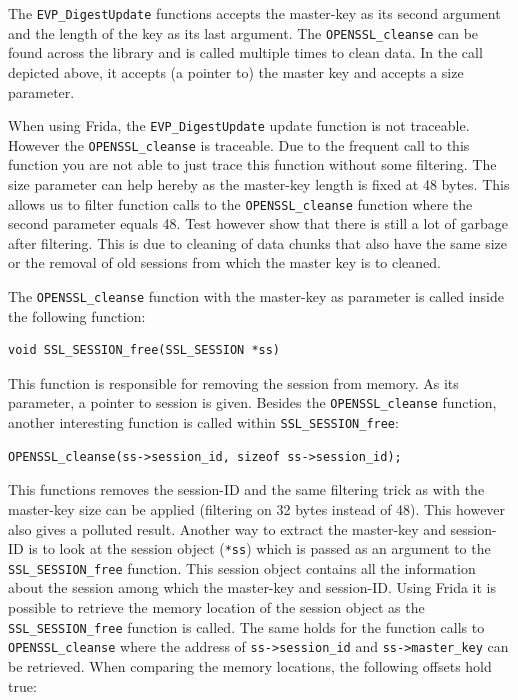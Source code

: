 \documentclass[12pt, a4paper]{report}
\begin{document}
The \texttt{EVP\_DigestUpdate} functions accepts the master-key as its second argument and the length of the key as its last argument. The \texttt{OPENSSL\_cleanse} can be found across the library and is called multiple times to clean data. In the call depicted above, it accepts (a pointer to) the master key and accepts a size parameter. 

When using Frida, the \texttt{EVP\_DigestUpdate} update function is not traceable. However the \texttt{OPENSSL\_cleanse} is traceable. Due to the frequent call to this function you are not able to just trace this function without some filtering. The size parameter can help hereby as the master-key length is fixed at 48 bytes. This allows us to filter function calls to the \texttt{OPENSSL\_cleanse} function where the second parameter equals 48. Test however show that there is still a lot of garbage after filtering. This is due to cleaning of data chunks that also have the same size or the removal of old sessions from which the master key is to cleaned. 


\noindent The \texttt{OPENSSL\_cleanse} function with the master-key as parameter is called inside the following function:

\begin{lstlisting}[frame=single, breaklines=true]
void SSL_SESSION_free(SSL_SESSION *ss)
\end{lstlisting}

This function is responsible for removing the session from memory. As its parameter, a pointer to session is given. Besides the \texttt{OPENSSL\_cleanse} function, another interesting function is called within \texttt{SSL\_SESSION\_free}:
\\
\begin{lstlisting}[frame=single, breaklines=true]
OPENSSL_cleanse(ss->session_id, sizeof ss->session_id);
\end{lstlisting}

This functions removes the session-ID and the same filtering trick as with the master-key size can be applied (filtering on 32 bytes instead of 48). This however also gives a polluted result.
\newline
\newline
\noindent Another way to extract the master-key and session-ID is to look at the session object (\texttt{*ss}) which is passed as an argument to the \texttt{SSL\_SESSION\_free} function. This session object contains all the information about the session among which the master-key and session-ID. Using Frida it is possible to retrieve the memory location of the session object as the \texttt{SSL\_SESSION\_free} function is called. The same holds for the function calls to \texttt{OPENSSL\_cleanse} where the address of \texttt{ss->session\_id} and \texttt{ss->master\_key} can be retrieved. When comparing the memory locations, the following offsets hold true:
\end{document}
